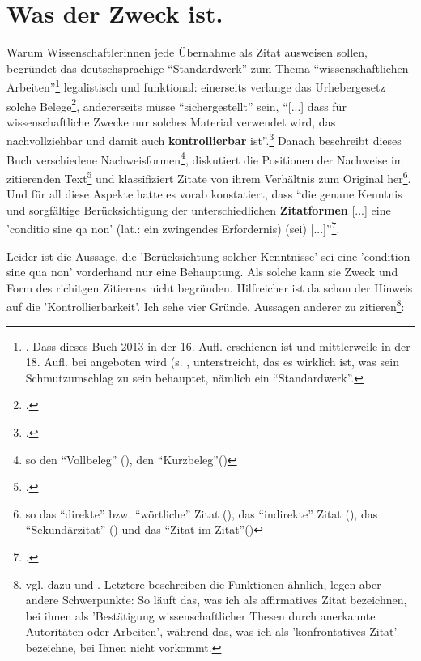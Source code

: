 \section{Was der Zweck ist.}

Warum Wissenschaftlerinnen jede Übernahme als Zitat ausweisen sollen, begründet das deutschsprachige \enquote{Standardwerk} zum Thema \enquote{wissenschaftlichen Arbeiten}\footnote{\cite[vgl.][S. 159ff]{Theisen2013a}. Dass dieses Buch 2013 in der 16. Aufl. erschienen ist und mittlerweile in der 18. Aufl. bei angeboten wird (s. , unterstreicht, das es wirklich ist, was sein Schmutzumschlag zu sein behauptet, nämlich ein \enquote{Standardwerk}.} legalistisch und funktional: einerseits verlange das Urhebergesetz solche Belege\footcite[vgl.][159]{Theisen2013a}, andererseits müsse \enquote{sichergestellt} sein, \enquote{[...] dass für wissenschaftliche Zwecke nur solches Material verwendet wird, das nachvollziehbar und damit auch \textbf{kontrollierbar} ist}.\footcite[vgl.][160]{Theisen2013a} Danach beschreibt dieses Buch verschiedene Nachweisformen\footnote{so den \enquote{Vollbeleg} (\cite[vgl.][S. 161f]{Theisen2013a}), den \enquote{Kurzbeleg}(\cite[vgl.][S. 163f]{Theisen2013a})}, diskutiert die Positionen der Nachweise im zitierenden Text\footcite[vgl.][S. 166ff]{Theisen2013a} und klassifiziert Zitate von ihrem Verhältnis zum Original her\footnote{so das \enquote{direkte} bzw. \enquote{wörtliche} Zitat (\cite[vgl.][S. 169ff]{Theisen2013a}), das \enquote{indirekte} Zitat (\cite[vgl.][S. 174ff]{Theisen2013a}), das \enquote{Sekundärzitat}  (\cite[vgl.][S. 177f]{Theisen2013a}) und das \enquote{Zitat im Zitat}(\cite[vgl.][179]{Theisen2013a})}. Und für all diese Aspekte hatte es vorab konstatiert, dass \enquote{die genaue Kenntnis und sorgfältige Berücksichtigung der unterschiedlichen \textbf{Zitatformen} [...] eine 'conditio sine qa non' (lat.: ein zwingendes Erfordernis) (sei) [...]}\footcite[vgl.][S. 159 {herv. u. übers. i.O.}]{Theisen2013a}.

Leider ist die Aussage, die 'Berücksichtung solcher Kenntnisse' sei eine 'condition sine qua non' vorderhand nur eine Behauptung. Als solche kann sie Zweck und Form des richitgen Zitierens nicht begründen. Hilfreicher ist da schon der Hinweis auf die 'Kontrollierbarkeit'. Ich sehe vier Gründe, Aussagen anderer zu zitieren\footnote{vgl. dazu \cite[][52]{ModLanAss2009a} und \cite[][187]{RueStaFra1980a}. Letztere beschreiben die Funktionen ähnlich, legen aber andere Schwer\-punk\-te: So läuft das, was ich als affirmatives Zitat bezeichnen, bei ihnen als 'Bestätigung wissenschaftlicher Thesen durch anerkannte Autoritäten oder Arbeiten', während das, was ich als 'konfrontatives Zitat' bezeichne, bei Ihnen nicht vorkommt.}:

